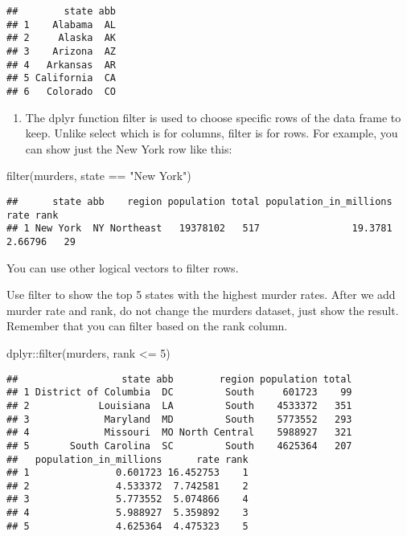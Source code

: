 \documentclass[
]{article}
\newenvironment{Shaded}{\begin{snugshade}}{\end{snugshade}}
\newcommand{\DecValTok}[1]{\textcolor[rgb]{0.00,0.00,0.81}{#1}}
\newcommand{\FunctionTok}[1]{\textcolor[rgb]{0.00,0.00,0.00}{#1}}
\newcommand{\NormalTok}[1]{#1}
\newcommand{\SpecialCharTok}[1]{\textcolor[rgb]{0.00,0.00,0.00}{#1}}
\newcommand{\StringTok}[1]{\textcolor[rgb]{0.31,0.60,0.02}{#1}}
\providecommand{\tightlist}{%
  \setlength{\itemsep}{0pt}\setlength{\parskip}{0pt}}
\begin{document}
\begin{verbatim}
##        state abb
## 1    Alabama  AL
## 2     Alaska  AK
## 3    Arizona  AZ
## 4   Arkansas  AR
## 5 California  CA
## 6   Colorado  CO
\end{verbatim}

\begin{enumerate}
\def\labelenumi{\arabic{enumi}.}
\setcounter{enumi}{3}
\tightlist
\item
  The dplyr function filter is used to choose specific rows of the data
  frame to keep. Unlike select which is for columns, filter is for rows.
  For example, you can show just the New York row like this:
\end{enumerate}

\begin{Shaded}
\begin{Highlighting}[]
\FunctionTok{filter}\NormalTok{(murders, state }\SpecialCharTok{==} \StringTok{"New York"}\NormalTok{)}
\end{Highlighting}
\end{Shaded}

\begin{verbatim}
##      state abb    region population total population_in_millions    rate rank
## 1 New York  NY Northeast   19378102   517                19.3781 2.66796   29
\end{verbatim}

You can use other logical vectors to filter rows.

Use filter to show the top 5 states with the highest murder rates. After
we add murder rate and rank, do not change the murders dataset, just
show the result. Remember that you can filter based on the rank column.

\begin{Shaded}
\begin{Highlighting}[]
\NormalTok{dplyr}\SpecialCharTok{::}\FunctionTok{filter}\NormalTok{(murders, rank }\SpecialCharTok{\textless{}=} \DecValTok{5}\NormalTok{)}
\end{Highlighting}
\end{Shaded}

\begin{verbatim}
##                  state abb        region population total
## 1 District of Columbia  DC         South     601723    99
## 2            Louisiana  LA         South    4533372   351
## 3             Maryland  MD         South    5773552   293
## 4             Missouri  MO North Central    5988927   321
## 5       South Carolina  SC         South    4625364   207
##   population_in_millions      rate rank
## 1               0.601723 16.452753    1
## 2               4.533372  7.742581    2
## 3               5.773552  5.074866    4
## 4               5.988927  5.359892    3
## 5               4.625364  4.475323    5
\end{verbatim}
\end{document}
